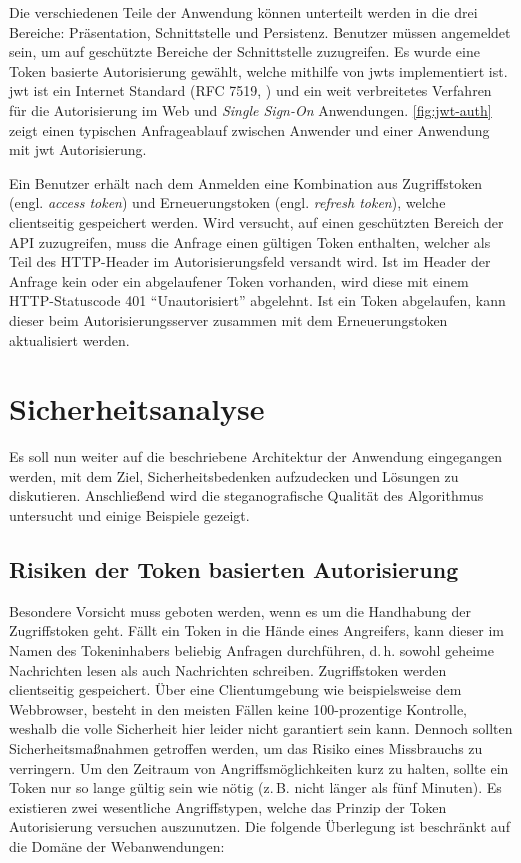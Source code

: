 \noindent
Die verschiedenen Teile der Anwendung können unterteilt werden in die
drei Bereiche: Präsentation, Schnittstelle und Persistenz.
Benutzer müssen angemeldet sein, um auf geschützte Bereiche der Schnittstelle zuzugreifen.
Es wurde eine Token basierte Autorisierung gewählt, welche mithilfe von \acp{jwt}
implementiert ist. \ac{jwt} ist ein Internet Standard (RFC 7519, \cite{SITE:jwt}) und ein
weit verbreitetes Verfahren für die Autorisierung im Web und \textit{Single Sign-On} Anwendungen.
\autoref{fig:jwt-auth} zeigt einen typischen Anfrageablauf zwischen Anwender und einer Anwendung
mit \acs{jwt} Autorisierung.
\newpage



\noindent
Ein Benutzer erhält nach dem Anmelden eine Kombination aus Zugriffstoken
(engl. \textit{access token}) und Erneuerungstoken (engl. \textit{refresh token}),
welche clientseitig gespeichert werden.
Wird versucht, auf einen geschützten Bereich der API zuzugreifen, muss die Anfrage
einen gültigen Token enthalten, welcher als Teil des HTTP-Header im
Autorisierungsfeld versandt wird.
Ist im Header der Anfrage kein oder ein
abgelaufener Token vorhanden, wird diese mit einem HTTP-Statuscode 401 \enquote{Unautorisiert}
abgelehnt. Ist ein Token abgelaufen, kann dieser beim Autorisierungsserver
zusammen mit dem Erneuerungstoken aktualisiert werden.

\section{Sicherheitsanalyse}
Es soll nun weiter auf die beschriebene Architektur der Anwendung eingegangen werden,
mit dem Ziel, Sicherheitsbedenken aufzudecken und Lösungen zu diskutieren.
Anschließend wird die steganografische Qualität des Algorithmus
untersucht und einige Beispiele gezeigt.

\subsection{Risiken der Token basierten Autorisierung}
Besondere Vorsicht muss geboten werden, wenn es um die Handhabung
der Zugriffstoken geht.
Fällt ein Token in die Hände eines Angreifers, kann dieser
im Namen des Tokeninhabers beliebig Anfragen durchführen, d.\,h. sowohl geheime Nachrichten
lesen als auch Nachrichten schreiben.
Zugriffstoken werden clientseitig gespeichert. Über eine
Clientumgebung wie beispielsweise dem Webbrowser, besteht in den meisten
Fällen keine 100-prozentige Kontrolle, weshalb die volle Sicherheit hier leider nicht
garantiert sein kann. Dennoch sollten Sicherheitsmaßnahmen getroffen werden, um
das Risiko eines Missbrauchs zu verringern.
Um den Zeitraum von Angriffsmöglichkeiten kurz zu halten, sollte
ein Token nur so lange gültig sein wie nötig
(z.\,B. nicht länger als fünf Minuten).
Es existieren zwei wesentliche Angriffstypen, welche das Prinzip der Token Autorisierung
versuchen auszunutzen. Die folgende Überlegung ist beschränkt auf die Domäne
der Webanwendungen:

